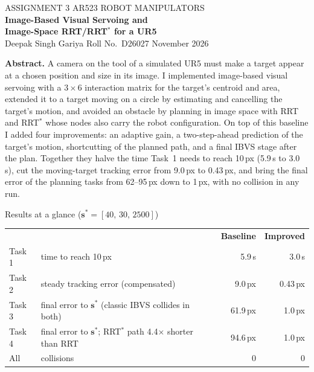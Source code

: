 \documentclass[11pt,a4paper]{article}
\newcommand{\vect}[1]{\bm{#1}}
\begin{document}
\thispagestyle{empty}
\begin{tcolorbox}[enhanced,colback=accent,colframe=accent,arc=0pt,outer arc=0pt,
                  left=14pt,right=14pt,top=14pt,bottom=12pt,width=\textwidth]
  {\color{white}\sffamily
   {\small ASSIGNMENT 3 \;\textbar\; AR523 ROBOT MANIPULATORS}\\[6pt]
   {\LARGE\bfseries Image-Based Visual Servoing and\\[2pt] Image-Space RRT/RRT$^{*}$ for a UR5}\\[10pt]
   {\normalsize Deepak Singh Gariya \;\textbullet\; Roll No.\ D26027 \;\textbullet\; November 2026}}
\end{tcolorbox}

\vspace{4pt}
\noindent\textbf{\sffamily\color{accent}Abstract.}\;
A camera on the tool of a simulated UR5 must make a target appear at a chosen position and size in
its image. I implemented image-based visual servoing with a $3\times6$ interaction matrix for the
target's centroid and area, extended it to a target moving on a circle by estimating and cancelling
the target's motion, and avoided an obstacle by planning in image space with RRT and RRT$^{*}$ whose
nodes also carry the robot configuration. On top of this baseline I added four improvements: an
adaptive gain, a two-step-ahead prediction of the target's motion, shortcutting of the planned path,
and a final IBVS stage after the plan. Together they halve the time Task~1 needs to reach 10\,px
(5.9\,s to 3.0\,s), cut the moving-target tracking error from 9.0\,px to 0.43\,px, and bring the final
error of the planning tasks from 62--95\,px down to 1\,px, with no collision in any run.


\begin{keybox}{Results at a glance ($\vect s^{*}=[40,\,30,\,2500]$)}
\small
\begin{tabularx}{\linewidth}{@{}lXrr@{}}
  & & \textbf{Baseline} & \textbf{Improved}\\
  Task 1 & time to reach 10\,px & 5.9\,s & 3.0\,s\\
  Task 2 & steady tracking error (compensated) & 9.0\,px & 0.43\,px\\
  Task 3 & final error to $\vect s^{*}$ (classic IBVS collides in both) & 61.9\,px & 1.0\,px\\
  Task 4 & final error to $\vect s^{*}$; RRT$^{*}$ path 4.4$\times$ shorter than RRT & 94.6\,px & 1.0\,px\\
  All & collisions & 0 & 0
\end{tabularx}
\end{keybox}
\end{document}
